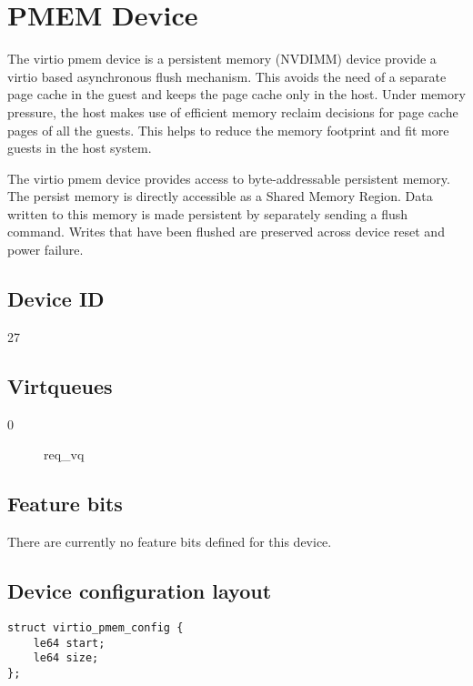 \section{PMEM Device}\label{sec:Device Types / PMEM Device}

The virtio pmem device is a persistent memory (NVDIMM) device
provide a virtio based asynchronous flush mechanism. This avoids the
need of a separate page cache in the guest and keeps the page cache
only in the host. Under memory pressure, the host makes use of
efficient memory reclaim decisions for page cache pages of all the
guests. This helps to reduce the memory footprint and fit more guests
in the host system.

The virtio pmem device provides access to byte-addressable persistent
memory. The persist memory is directly accessible as a Shared Memory Region.
Data written to this memory is made persistent by separately sending a
flush command. Writes that have been flushed are preserved across device
reset and power failure.

\subsection{Device ID}\label{sec:Device Types / PMEM Device / Device ID}
  27

\subsection{Virtqueues}\label{sec:Device Types / PMEM Device / Virtqueues}
\begin{description}
\item[0] req_vq
\end{description}

\subsection{Feature bits}\label{sec:Device Types / PMEM Device / Feature bits}

There are currently no feature bits defined for this device.

\subsection{Device configuration layout}\label{sec:Device Types / PMEM Device / Device configuration layout}

\begin{lstlisting}
struct virtio_pmem_config {
	le64 start;
	le64 size;
};
\end{lstlisting}

